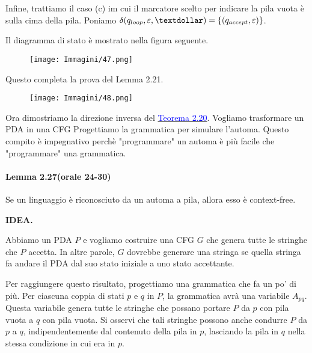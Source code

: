 \documentclass{article}
\begin{document}
Infine, trattiamo il caso (c) im cui il marcatore scelto per indicare la pila vuota \textdollar \text{ }è sulla cima della pila.
Poniamo $\delta(q_{loop},\varepsilon,\textdollar) = \{(q_{accept},\varepsilon)\}$.

Il diagramma di stato è mostrato nella figura seguente.
\begin{figure}[H]
    \centering
    \texttt{[image: Immagini/47.png]}
    \label{fig:state_diagram1}
\end{figure}
Questo completa la prova del Lemma 2.21.

\begin{figure}[H]
    \centering
    \texttt{[image: Immagini/48.png]}
    \label{fig:your_imag1}
\end{figure}

Ora dimostriamo la direzione inversa del \hyperref[teorema-2.20]{\textcolor{blue}{Teorema 2.20}}.
Vogliamo trasformare un PDA in una CFG
Progettiamo la grammatica per simulare l'automa.
Questo compito è impegnativo perchè "programmare" un automa è più facile che "programmare" una grammatica.

\paragraph{Lemma 2.27(orale 24-30)}
\label{lemma-2.27}
\text{ }

\begin{tcolorbox}[colback=blue!10!white, colframe=blue!50!black, title=Lemma 2.27]
    Se un linguaggio è riconosciuto da un automa a pila, allora esso è context-free.
\end{tcolorbox}

\textbf{IDEA.}

Abbiamo un PDA $P$ e vogliamo costruire una CFG $G$ che genera tutte le stringhe che $P$ accetta. 
In altre parole, $G$ dovrebbe generare una stringa se quella stringa fa andare il PDA dal suo stato iniziale a uno stato accettante.

Per raggiungere questo risultato, progettiamo una grammatica che fa un po' di più.
Per ciascuna coppia di stati $p$ e $q$ in $P$, la grammatica avrà una variabile $A_{pq}$.
Questa variabile genera tutte le stringhe che possano portare $P$ da $p$ con pila vuota a $q$ con pila vuota.
Si osservi che tali stringhe possono anche condurre $P$ da $p$ a $q$, indipendentemente dal contenuto della pila in $p$, lasciando la pila in $q$ nella stessa condizione in cui era in $p$.
\end{document}
